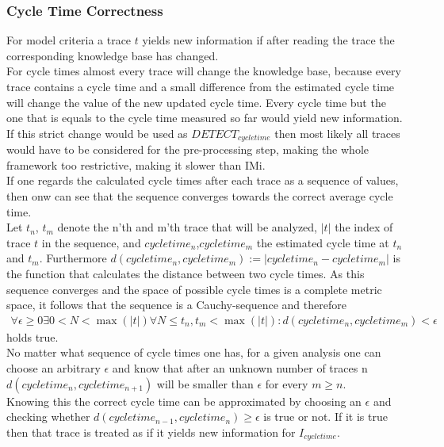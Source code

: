 \documentclass[
	a4paper,
	pagesize,
	pdftex,
	12pt,
	twoside, %
	BCOR=5mm, %
	ngerman,
	fleqn,
	final,
	]{scrartcl}
\begin{document}
\subsubsection{Cycle Time Correctness}
For model criteria a trace $t$ yields new information if after reading the trace the corresponding knowledge base has changed.\\ For cycle times almost every trace will change the knowledge base, because every trace contains a cycle time and a small difference from the estimated cycle time will change the value of the new updated cycle time. Every cycle time but the one that is equals to the cycle time measured so far would yield new information. If this strict change would be used as $DETECT_{cycle time}$ then most likely all traces would have to be considered for the pre-processing step, making the whole framework too restrictive, making it slower than IMi.\\
If one regards the calculated cycle times after each trace as a sequence of values, then onw can see that the sequence converges towards the correct average cycle time.\\
Let $t_n$, $t_m$ denote the n'th and m'th trace that will be analyzed, $|t|$ the index of trace $t$ in the sequence, and $cycle time_n$,$cycle time_m$ the estimated cycle time at $t_n$ and $t_m$. Furthermore $d(cycle time_n, cycle time_m):=|cycle time_n - cycle time_m|$ is the function that calculates the distance between two cycle times. As this sequence converges and the space of possible cycle times is a complete metric space, it follows that the sequence is a Cauchy-sequence and therefore
\begin{align*}
\forall \epsilon\geq0 \exists 0<N<\max(|t|) \forall N\leq t_n,t_m <\max(|t|): d(cycle time_n, cycle time_m)<\epsilon
\end{align*}
holds true.\\
No matter what sequence of cycle times one has, for a given analysis one can choose an arbitrary $\epsilon$ and know that after an unknown number of traces n $d(cycle time_n, cycle time_{n+1})$ will be smaller than $\epsilon$ for every $m\geq n$.\\
Knowing this  the correct cycle time can be approximated by choosing an $\epsilon$ and checking whether $d(cycle time_{n-1}, cycle time_n)\geq \epsilon$ is true or not. If it is true then that trace is treated as if it yields new information for $I_{cycle time}$.\\\\
\end{document}
